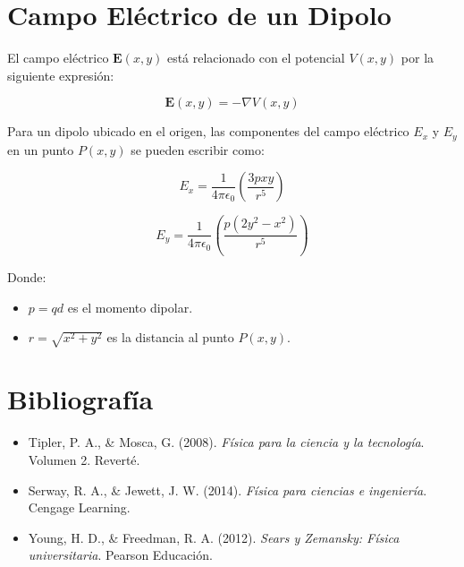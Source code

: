 \documentclass{article}
\begin{document}
\section*{Campo Eléctrico de un Dipolo}

El campo eléctrico \( \mathbf{E}(x, y) \) está relacionado con el potencial \( V(x, y) \) por la siguiente expresión:

\[
\mathbf{E}(x, y) = -\nabla V(x, y)
\]

Para un dipolo ubicado en el origen, las componentes del campo eléctrico \( E_x \) y \( E_y \) en un punto \( P(x, y) \) se pueden escribir como:

\[
E_x = \frac{1}{4\pi\epsilon_0} \left( \frac{3p x y}{r^5} \right)
\]

\[
E_y = \frac{1}{4\pi\epsilon_0} \left( \frac{p(2y^2 - x^2)}{r^5} \right)
\]


Donde:
\begin{itemize}
    \item \( p = qd \) es el momento dipolar.
    \item \( r = \sqrt{x^2 + y^2} \) es la distancia al punto \( P(x, y) \).
\end{itemize}

\section*{Bibliografía}
\begin{itemize}
    \item Tipler, P. A., \& Mosca, G. (2008). \textit{Física para la ciencia y la tecnología}. Volumen 2. Reverté.
    \item Serway, R. A., \& Jewett, J. W. (2014). \textit{Física para ciencias e ingeniería}. Cengage Learning.
    \item Young, H. D., \& Freedman, R. A. (2012). \textit{Sears y Zemansky: Física universitaria}. Pearson Educación.
\end{itemize}
\end{document}
